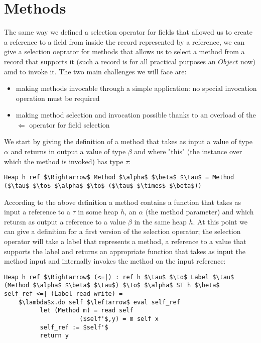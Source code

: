 \documentclass[a4paper]{article}
\begin{document}
\section{Methods}

The same way we defined a selection operator for fields that allowed us to create a reference to a field from inside the record represented by a reference, we can give a selection oeprator for methods that allows us to select a method from a record that supports it (such a record is for all practical purposes an $Object$ now) amd to invoke it. The two main challenges we will face are:
\begin{itemize}
\item making methods invocable through a simple application: no special invocation operation must be required
\item making method selection and invocation possible thanks to an overload of the $\Leftarrow$ operator for field selection
\end{itemize}

We start by giving the definition of a method that takes as input a value of type $\alpha$ and returns in output a value of type $\beta$ and where "this" (the instance over which the method is invoked) has type $\tau$:

\begin{lstlisting}
Heap h ref $\Rightarrow$ Method $\alpha$ $\beta$ $\tau$ = Method ($\tau$ $\to$ $\alpha$ $\to$ ($\tau$ $\times$ $\beta$))
\end{lstlisting}

According to the above definition a method contains a function that takes as input a reference to a $\tau$ in some heap $h$, an $\alpha$ (the method parameter) and which retursn as output a reference to a value $\beta$ in the same heap $h$. At this point we can give a definition for a first version of the selection operator; the selection operator will take a label that represents a method, a reference to a value that supports the label and returns an appropriate function that takes as input the method input and internally invokes the method on the input reference:

\begin{lstlisting}
Heap h ref $\Rightarrow$ (<=|) : ref h $\tau$ $\to$ Label $\tau$ (Method $\alpha$ $\beta$ $\tau$) $\to$ $\alpha$ ST h $\beta$
self_ref <=| (Label read write) =
    $\lambda$x.do self $\leftarrow$ eval self_ref
          let (Method m) = read self
                     ($self'$,y) = m self x
          self_ref := $self'$
          return y
\end{lstlisting}
\end{document}
